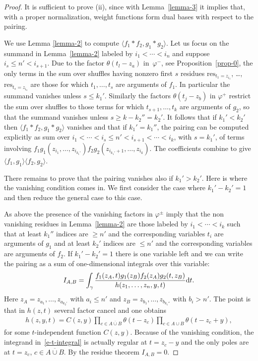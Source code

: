 \documentclass[10pt,a4paper]{amsart}
\numberwithin{equation}{section}
\begin{document}
\begin{proof} It is sufficient to prove (ii), since with Lemma~\ref{lemma-3} it implies that, with a proper normalization, weight functions form dual bases with respect to the pairing.

We use Lemma \ref{lemma-2} to compute $\langle f_1*f_2,g_1*g_2\rangle$. Let us focus on the summand in Lemma~\ref{lemma-2} labeled by $i_1<\cdots<i_n$ and suppose $i_s\leq n'<i_{s+1}$. Due to the factor $\theta(t_l-z_a)$ in~$\varphi^-$, see Proposition~\ref{prop-0}, the only terms in the sum over shuffles having nonzero first $s$ residues $\mathrm{res}_{t_1=z_{i_1}}$, \dots, $\mathrm{res}_{t_s=z_{i_s}}$ are those for which $t_1,\dots, t_s$ are arguments of $f_1$. In particular the summand vanishes unless $s\leq k_1'$. Similarly the factors $\theta(t_j-z_b)$ in $\varphi^+$ restrict the sum over shuffles to those terms for which $t_{s+1},\dots,t_k$ are arguments of $g_2$, so that the summand vanishes unless $s\geq k-k_2''=k_2'$. It follows that if $k_1'<k_2'$ then $\langle f_1*f_2,g_1*g_2\rangle$ vanishes and that if $k_1'=k_1''$, the pairing can be computed explicitly as sum over $i_1<\cdots<i_s\leq n'<i_{s+1}<\cdots<i_{k}$, with $s=k_1'$, of terms involving $f_1g_1(z_{i_1},\dots,z_{i_{k_1'}})f_2g_2(z_{i_{k_1'}+1},\dots,z_{i_k})$. The coefficients combine to give $\langle f_1,g_1\rangle\langle f_2,g_2\rangle$.

There remains to prove that the pairing vanishes also if $k_1'>k_2'$. Here is where the vanishing condition comes in. We first consider the case where $k_1'-k_2'=1$ and then reduce the general case to this case.

As above the presence of the vanishing factors in $\varphi^\pm$ imply that the non vanishing residues in Lemma~\ref{lemma-2} are those labeled by $i_1<\cdots<i_k$ such that at least $k_1''$ indices are $\geq n'$ and the corresponding variables $t_i$ are arguments of $g_1$ and at least $k_2'$ indices are $\leq n'$ and the corresponding variables are arguments of $f_2$. If $k_1'-k_2'=1$ there is one variable left and we can write the pairing as a sum of one-dimensional integrals over this variable:
 \begin{gather}\label{e-t-integral}
 I_{A,B}=\int_\gamma \frac{f_1(z_A,t)g_1(z_B)f_2(z_A)g_2(t,z_B)}{h(z_1,\dots,z_n,y,t)}{\rm d}t.
 \end{gather}
Here $z_A=z_{a_1},\dots,z_{a_{k_2'}}$ with $a_i\leq n'$ and $z_B=z_{b_1},\dots,z_{b_{k_1''}}$ with $b_i>n'$. The point is that in $h(z,t)$ several factor cancel and one obtains
\begin{gather*}
 h(z,y,t)=C(z,y)\prod_{c\in \overline {A\cup B}}\theta(t-z_c) \prod_{c\in A\cup B}\theta(t-z_c+y),
 \end{gather*}
for some $t$-independent function $C(z,y)$. Because of the vanishing condition, the integrand in~\eqref{e-t-integral} is actually regular at $t=z_c-y$ and the only poles are at $t=z_c$, $c\in\overline {A\cup B}$. By the residue theorem $I_{A,B}=0$.


\end{proof}
\end{document}
